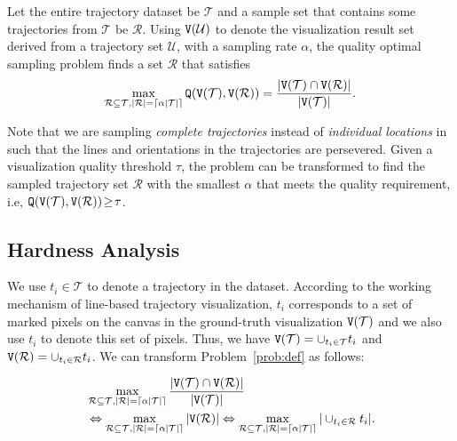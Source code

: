 \begin{problem}\label{prob:def}
Let the entire trajectory dataset be $\mathcal{T}$ and a sample set that contains some trajectories from $\mathcal{T}$ be $\mathcal{R}$.
Using $\mathtt{V}(\mathcal{U})$ to denote the visualization result set derived from a trajectory set $\mathcal{U}$, with a sampling rate $\alpha$,
the quality optimal sampling problem finds a set $\mathcal{R}$ that satisfies
	\begin{equation}\label{eq:opp}
	\max_{\mathcal{R} \subseteq \mathcal{T}, |\mathcal{R}| = \lceil \alpha |\mathcal{T}| \rceil} \mathtt{Q}(\mathtt{V}(\mathcal{T}), \mathtt{V}(\mathcal{R}))=\frac{|\mathtt{V}(\mathcal{T}) \cap \mathtt{V}(\mathcal{R})|}{|\mathtt{V}(\mathcal{T})|}.
	\end{equation}
\end{problem}
Note that we are sampling \textit{complete trajectories} instead of \textit{individual locations} in \prob{} such that the lines and orientations in the trajectories are persevered. Given a visualization quality threshold $\tau$, the \prob{} problem can be transformed to find the sampled trajectory set $\mathcal{R}$ with the smallest $\alpha$ that meets the quality requirement, i.e, $\mathtt{Q}(\mathtt{V}(\mathcal{T}), \mathtt{V}(\mathcal{R})) \!\ge\! \tau$.




\subsection{Hardness Analysis}\label{sec:hard}
We use $t_i\! \in \! \mathcal{T}$ to denote a trajectory in the dataset.
According to the working mechanism of line-based trajectory visualization, $t_i$ corresponds to a set of marked pixels on the canvas in the ground-truth visualization $\mathtt{V}(\mathcal{T})$ and we also use $t_i$ to denote this set of pixels.
Thus, we have $\mathtt{V}(\mathcal{T}) = \cup_{t_i \in \mathcal{T}} t_i$ and $\mathtt{V}(\mathcal{R}) = \cup_{t_i \in \mathcal{R}} t_i$.
We can transform Problem~\ref{prob:def} as follows:

\begin{align}\label{eqn:obj2}
& \max_{\oR \subseteq \D, |\oR| = \lceil \alpha |\mathcal{T}| \rceil}  \frac{|\VV(\mathcal{T}) \cap \VV(\mathcal{R})|}{|\VV(\mathcal{T})|} \\ \nonumber
& \Leftrightarrow \max_{\oR \subseteq \D, |\oR| = \lceil \alpha |\mathcal{T}| \rceil}   |\VV(\oR)|   %
 \Leftrightarrow \max_{\oR \subseteq \D, |\oR| = \lceil \alpha |\mathcal{T}| \rceil} | \cup_{t_i \in \oR} t_i |.
\end{align}

